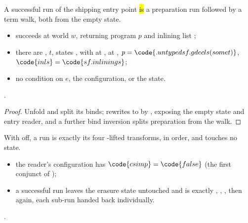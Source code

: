 \begin{theorem}
\label{thm:erase_run_ok}
\leanok
{}
 A successful run of the shipping entry point \hl{is} a preparation run followed by a
term walk, both from the empty state.
\begin{itemize}
\item {}  succeeds at world $w$, returning program $p$ and
inlining list ;
\item {} there are , $t$, states ,  with
 at ,
 at , $p = \code{.untyped sf.gdecls (some t)}$,
$\code{inls} = \code{sf.inlinings}$;
\item no condition on $e$, the configuration, or the state.
\end{itemize}
 \stProved{}.
\end{theorem}
\begin{proof}
\leanok
{}
 Unfold  and split its binds;  rewrites
 to  by , exposing the empty state and
entry reader, and a further bind inversion splits preparation from the walk.
\end{proof}
\begin{theorem}
\label{thm:run_prepare_erasure_ok}
\leanok
{}
 With  off, a  run is exactly its four
-lifted transforms, in order, and touches no state.
\begin{itemize}
\item {} the reader's configuration has $\code{csimp} = \code{false}$ (the first conjunct of
);
\item {} a successful run leaves the erasure state untouched and is exactly
, ,
, then  again, each sub-run handed back
individually.
\end{itemize}
 \stProved{}.
\end{theorem}
